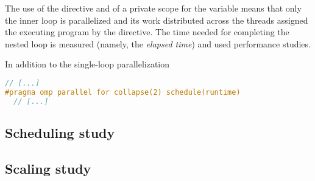 \noindent
The use of the  directive and of a private scope for the  variable means that only the inner loop is parallelized and its work distributed across the threads assigned the executing program by the  directive. The time needed for completing the nested loop is measured (namely, the \emph{elapsed time}) and used performance studies.

In addition to the single-loop parallelization 



\begin{lstlisting}[language=C]
  // [...]
#pragma omp parallel for collapse(2) schedule(runtime)
  // [...]
\end{lstlisting}

\subsection{Scheduling study}\label{sec:method-sched}

\subsection{Scaling study}\label{sec:method-scale}